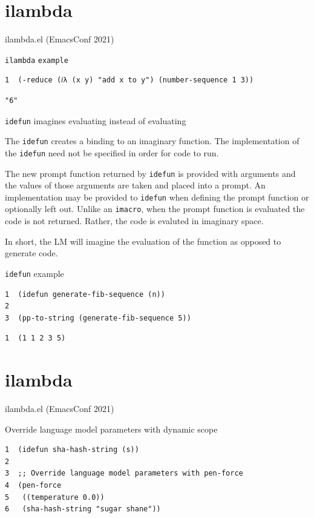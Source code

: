 \documentclass[presentation]{beamer}
\begin{document}
\section{ilambda}
\label{sec:org0c49097}
\begin{frame}[label={sec:org9d817f8},fragile]{ilambda.el (EmacsConf 2021)}
 \begin{block}{\texttt{ilambda} \texttt{example}}
{\tiny
\begin{verbatim}
1  (-reduce (𝑖λ (x y) "add x to y") (number-sequence 1 3))
\end{verbatim}
}

{\tiny
\begin{verbatim}
"6"
\end{verbatim}
}
\end{block}

\begin{block}{\texttt{idefun} imagines evaluating instead of evaluating}
{\tiny
The \texttt{idefun} creates a binding to an imaginary
function. The implementation of the \texttt{idefun}
need not be specified in order for code to
run.

The new prompt function returned by \texttt{idefun} is provided with arguments and the
values of those arguments are taken and placed
into a prompt. An implementation may be
provided to \texttt{idefun} when defining the prompt function or optionally left out.
Unlike an \texttt{imacro}, when the prompt function
is evaluated the code is not returned. Rather,
the code is evaluted in imaginary space.

In short, the LM will imagine the evaluation
of the function as opposed to generate code.
}
\end{block}

\begin{block}{\texttt{idefun} example}
{\tiny
\begin{verbatim}
1  (idefun generate-fib-sequence (n))
2  
3  (pp-to-string (generate-fib-sequence 5))
\end{verbatim}
}

{\tiny
\begin{verbatim}
1  (1 1 2 3 5)
\end{verbatim}
}
\end{block}
\end{frame}

\section{ilambda}
\label{sec:org8bf7e3e}
\begin{frame}[label={sec:org3d96fbd},fragile]{ilambda.el (EmacsConf 2021)}
 \begin{block}{Override language model parameters with dynamic scope}
\begin{verbatim}
1  (idefun sha-hash-string (s))
2  
3  ;; Override language model parameters with pen-force
4  (pen-force
5   ((temperature 0.0))
6   (sha-hash-string "sugar shane"))
\end{verbatim}
\end{block}
\end{frame}
\end{document}
